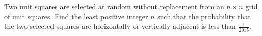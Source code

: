 Two unit squares are selected at random without replacement from an $n\times n$ grid of unit squares. Find the least positive integer $n$ such that the probability that the two selected squares are horizontally or vertically adjacent is less than $\frac{1}{2015}$.